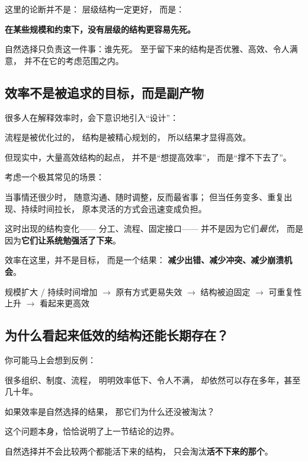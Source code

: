 \documentclass[openany, a4paper, 12pt]{book}
\newcommand{\lowfreq}[1]{\textbf{\textcolor{red!70!black}{#1}}}
\newenvironment{logicmap}{
	\begin{tcolorbox}[
		colback=blue!5!white,      %
		colframe=blue!50!black,    %
		title=\textbf{逻辑地图 (Logic Map)}, %
		fonttitle=\bfseries,
		sharp corners=south,       %
		boxrule=0.5mm
		]
	\centering
	}{
	\end{tcolorbox}
}
\begin{document}
这里的论断并不是：
层级结构一定更好，
而是：

\lowfreq{在某些规模和约束下，没有层级的结构更容易先死。}

自然选择只负责这一件事：谁先死。
至于留下来的结构是否优雅、高效、令人满意，
并不在它的考虑范围之内。

\subsection{效率不是被追求的目标，而是副产物}

\begin{readingnote}
	很多人在解释效率时，会下意识地引入“设计”：
	
	流程是被优化过的，
	结构是被精心规划的，
	所以结果才显得高效。
	
	但现实中，大量高效结构的起点，
	并不是“想提高效率”，
	而是“撑不下去了”。
\end{readingnote}

考虑一个极其常见的场景：

当事情还很少时，
随意沟通、随时调整，反而最省事；
但当任务变多、重复出现、持续时间拉长，
原本灵活的方式会迅速变成负担。

这时出现的结构变化——
分工、流程、固定接口——
并不是因为它们\emph{最优}，
而是因为\lowfreq{它们让系统勉强活了下来}。

效率在这里，并不是目标，
而是一个结果：
\lowfreq{减少出错、减少冲突、减少崩溃机会}。

\begin{logicmap}
	规模扩大 / 持续时间增加
	$\rightarrow$ 原有方式更易失效
	$\rightarrow$ 结构被迫固定
	$\rightarrow$ 可重复性上升
	$\rightarrow$ 看起来更高效
\end{logicmap}

\subsection{为什么看起来低效的结构还能长期存在？}

\begin{readingnote}
	你可能马上会想到反例：
	
	很多组织、制度、流程，
	明明效率低下、令人不满，
	却依然可以存在多年，甚至几十年。
	
	如果效率是自然选择的结果，
	那它们为什么还没被淘汰？
\end{readingnote}

这个问题本身，恰恰说明了上一节结论的边界。

自然选择并不会比较两个都能活下来的结构，
只会淘汰\lowfreq{活不下来的那个}。
\end{document}
